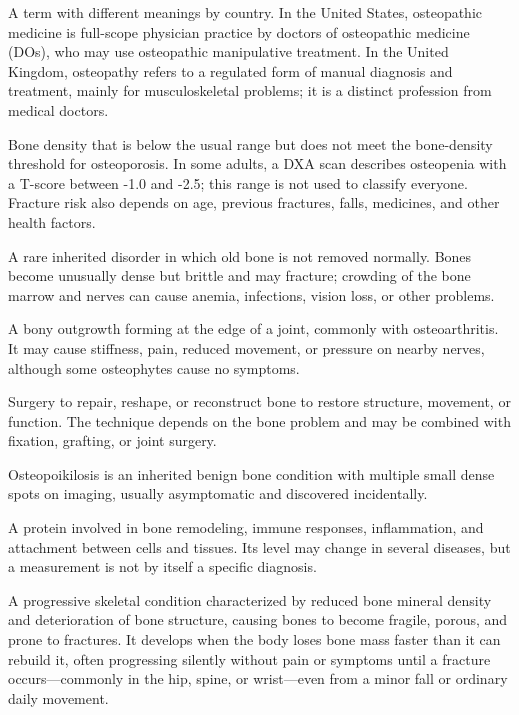  A term with different meanings by country. In the United States, osteopathic medicine is full-scope physician practice by doctors of osteopathic medicine (DOs), who may use osteopathic manipulative treatment. In the United Kingdom, osteopathy refers to a regulated form of manual diagnosis and treatment, mainly for musculoskeletal problems; it is a distinct profession from medical doctors.

 Bone density that is below the usual range but does not meet the bone-density threshold for osteoporosis. In some adults, a DXA scan describes osteopenia with a T-score between -1.0 and -2.5; this range is not used to classify everyone. Fracture risk also depends on age, previous fractures, falls, medicines, and other health factors.

 A rare inherited disorder in which old bone is not removed normally. Bones become unusually dense but brittle and may fracture; crowding of the bone marrow and nerves can cause anemia, infections, vision loss, or other problems.

 A bony outgrowth forming at the edge of a joint, commonly with osteoarthritis. It may cause stiffness, pain, reduced movement, or pressure on nearby nerves, although some osteophytes cause no symptoms.

 Surgery to repair, reshape, or reconstruct bone to restore structure, movement, or function. The technique depends on the bone problem and may be combined with fixation, grafting, or joint surgery.

 Osteopoikilosis is an inherited benign bone condition with multiple small dense spots on imaging, usually asymptomatic and discovered incidentally.

 A protein involved in bone remodeling, immune responses, inflammation, and attachment between cells and tissues. Its level may change in several diseases, but a measurement is not by itself a specific diagnosis.

 A progressive skeletal condition characterized by reduced bone mineral density and deterioration of bone structure, causing bones to become fragile, porous, and prone to fractures. It develops when the body loses bone mass faster than it can rebuild it, often progressing silently without pain or symptoms until a fracture occurs—commonly in the hip, spine, or wrist—even from a minor fall or ordinary daily movement.

